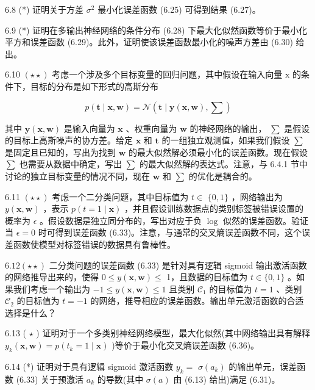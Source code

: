 \documentclass[10pt]{article}
\begin{document}
6.8 (*) 证明关于方差 \({\sigma }^{2}\) 最小化误差函数 (6.25) 可得到结果 (6.27)。

6.9 (*) 证明在多输出神经网络的条件分布 (6.28) 下最大化似然函数等价于最小化平方和误差函数 (6.29)。此外，证明使该误差函数最小化的噪声方差由 (6.30) 给出。

6.10 \(\left( {\star  \star  }\right)\) 考虑一个涉及多个目标变量的回归问题，其中假设在输入向量 \(\mathrm{x}\) 的条件下，目标的分布是如下形式的高斯分布

\[
p\left( {\mathbf{t} \mid  \mathbf{x},\mathbf{w}}\right)  = \mathcal{N}\left( {\mathbf{t} \mid  \mathbf{y}\left( {\mathbf{x},\mathbf{w}}\right) ,\mathbf{\sum }}\right)  \tag{6.66}
\]

其中 \(\mathbf{y}\left( {\mathbf{x},\mathbf{w}}\right)\) 是输入向量为 \(\mathbf{x}\) 、权重向量为 \(\mathbf{w}\) 的神经网络的输出， \(\mathbf{\sum }\) 是假设的目标上高斯噪声的协方差。给定 \(\mathbf{x}\) 和 \(\mathbf{t}\) 的一组独立观测值，如果我们假设 \(\sum\) 是固定且已知的，写出为找到 \(\mathbf{w}\) 的最大似然解必须最小化的误差函数。现在假设 \(\sum\) 也需要从数据中确定，写出 \(\mathbf{\sum }\) 的最大似然解的表达式。注意，与 6.4.1 节中讨论的独立目标变量的情况不同，现在 \(\mathbf{w}\) 和 \(\mathbf{\sum }\) 的优化是耦合的。

6.11 \(\left( {\star  \star  }\right)\) 考虑一个二分类问题，其中目标值为 \(t \in\)  \(\{ 0,1\}\) ，网络输出为 \(y\left( {\mathbf{x},\mathbf{w}}\right)\) ，表示 \(p\left( {t = 1 \mid  \mathbf{x}}\right)\) ，并且假设训练数据点的类别标签被错误设置的概率为 \(\epsilon\) 。假设数据是独立同分布的，写出对应于负 \(\log\) 似然的误差函数。验证当 \(\epsilon  = 0\) 时可得到误差函数 (6.33)。注意，与通常的交叉熵误差函数不同，这个误差函数使模型对标签错误的数据具有鲁棒性。

\({6.12}\left( {\star  \star  }\right)\) 二分类问题的误差函数 (6.33) 是针对具有逻辑 sigmoid 输出激活函数的网络推导出来的，使得 \(0 \leq  y\left( {\mathbf{x},\mathbf{w}}\right)  \leq\) 1，且数据的目标值为 \(t \in  \{ 0,1\}\) 。如果我们考虑一个输出为 \(- 1 \leq  y\left( {\mathbf{x},\mathbf{w}}\right)  \leq  1\) 且类别 \({\mathcal{C}}_{1}\) 的目标值为 \(t = 1\) 、类别 \({\mathcal{C}}_{2}\) 的目标值为 \(t =  - 1\) 的网络，推导相应的误差函数。输出单元激活函数的合适选择是什么？

6.13 ( \(\star\) ) 证明对于一个多类别神经网络模型，最大化似然(其中网络输出具有解释 \({y}_{k}\left( {\mathbf{x},\mathbf{w}}\right)  = p\left( {{t}_{k} = 1 \mid  \mathbf{x}}\right)\) )等价于最小化交叉熵误差函数 (6.36)。

6.14 (*) 证明对于具有逻辑 sigmoid 激活函数 \({y}_{k} =\)  \(\sigma \left( {a}_{k}\right)\) 的输出单元，误差函数 (6.33) 关于预激活 \({a}_{k}\) 的导数(其中 \(\sigma \left( a\right)\) 由 (6.13) 给出)满足 (6.31)。
\end{document}
